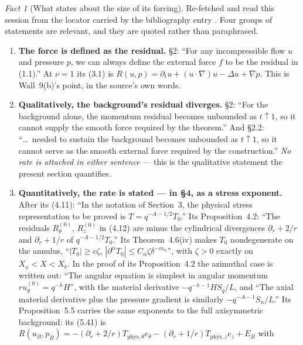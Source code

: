 \documentclass[11pt]{article}
\theoremstyle{definition}
\theoremstyle{remark}
\newtheorem{fact}[theorem]{Fact}
\newcommand{\abs}[1]{\left|#1\right|}
\newcommand{\grad}{\nabla}
\begin{document}
\begin{fact}[What \cite{OpenAI2026} states about the size of its forcing]
  \label{fact:wpt3-source-forcing}
  Re-fetched and read this session from the locator carried by the
  bibliography entry \cite{OpenAI2026}. Four groups of statements are relevant,
  and they are quoted rather than paraphrased.
  \begin{enumerate}[label=(\roman*),leftmargin=2.6em]
    \item \textbf{The force is defined as the residual.} \S2: ``For any
      incompressible flow $u$ and pressure $p$, we can always define the
      external force $f$ to be the residual in (1.1).'' At $\nu=1$ its (3.1)
      is $R(u,p)=\partial_tu+(u\cdot\grad)u-\Delta u+\grad p$. This is
      Wall~9(b)'s point, in the source's own words.
    \item \textbf{Qualitatively, the background's residual diverges.} \S2:
      ``For the background alone, the momentum residual becomes unbounded as
      $t\uparrow1$, so it cannot supply the smooth force required by the
      theorem.'' And \S2.2: ``\dots\ needed to sustain the background becomes
      unbounded as $t\uparrow1$, so it cannot serve as the smooth external
      force required by the construction.'' \emph{No rate is attached in
      either sentence} --- this is the qualitative statement the present
      section quantifies.
    \item \textbf{Quantitatively, the rate is stated --- in \S4, as a stress
      exponent.} After its (4.11): ``In the notation of Section~3, the
      physical stress representation to be proved is $T=q^{-A-1/2}T_0$.''
      Its Proposition~4.2: ``The residuals $R^{(0)}_\theta$, $R^{(0)}_z$ in
      (4.12) are minus the cylindrical divergences $\partial_r+2/r$ and
      $\partial_r+1/r$ of $q^{-A-1/2}T_0$.'' Its Theorem~4.6(iv) makes $T_0$
      nondegenerate on the annulus, ``$\abs{T_0}\geq c\zeta$,
      $\abs{\partial^\alpha T_0}\leq C_\alpha\zeta\delta^{-m_\alpha}$'',
      with $\zeta>0$ exactly on $X_a<X<X_b$. In the proof of its
      Proposition~4.2 the azimuthal case is written out:
      ``The angular equation is simplest in angular momentum
      $ru^{(0)}_\theta=q^{-h}H$'', with the material derivative
      $-q^{-h-1}HS_q/L$, and ``The axial material derivative plus the
      pressure gradient is similarly $-q^{-A-1}S_n/L$.''
      Its Proposition~5.5 carries the same exponents to the full
      axisymmetric background: its (5.41) is
      $R(u_B,p_B)=-(\partial_r+2/r)T_{\mathrm{phys},\theta}e_\theta
        -(\partial_r+1/r)T_{\mathrm{phys},z}e_z+E_B$ with

\end{enumerate}
\end{fact}
\end{document}

